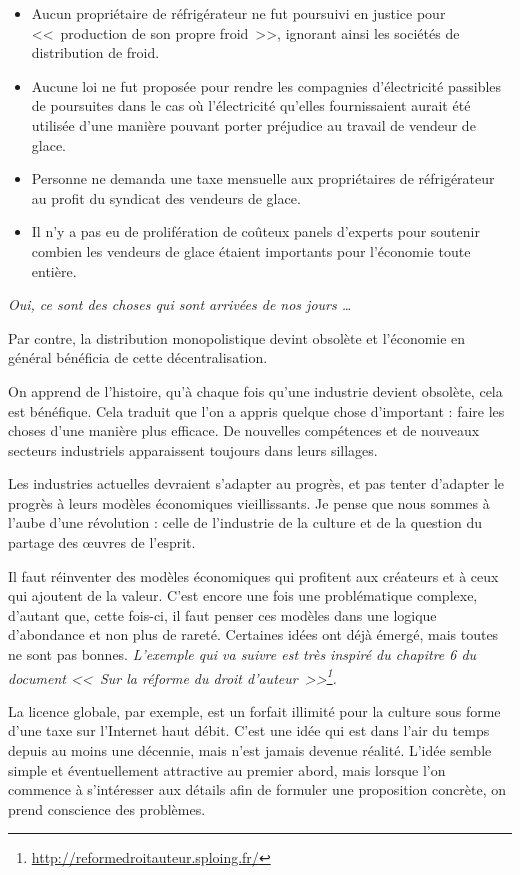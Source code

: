\begin{itemize}
\item Aucun propriétaire de réfrigérateur ne fut poursuivi en justice pour <<~production de son propre froid~>>, ignorant ainsi les sociétés de distribution de froid.
\item Aucune loi ne fut proposée pour rendre les compagnies d'électricité passibles de poursuites dans le cas où l'électricité qu'elles fournissaient aurait été utilisée d'une manière pouvant porter préjudice au travail de vendeur de glace.
\item Personne ne demanda une taxe mensuelle aux propriétaires de réfrigérateur au profit du syndicat des vendeurs de glace.
\item Il n'y a pas eu de prolifération de coûteux panels d'experts pour soutenir combien les vendeurs de glace étaient importants pour l'économie toute entière.
\end{itemize}

\textit{Oui, ce sont des choses qui sont arrivées de nos jours \dots{}}

Par contre, la distribution monopolistique devint obsolète et l'économie en général bénéficia de cette décentralisation.

On apprend de l'histoire, qu'à chaque fois qu'une industrie devient obsolète, cela est bénéfique.
Cela traduit que l'on a appris quelque chose d'important : faire les choses d'une manière plus efficace.
De nouvelles compétences et de nouveaux secteurs industriels apparaissent toujours dans leurs sillages.

Les industries actuelles devraient s'adapter au progrès, et pas tenter d'adapter le progrès à leurs modèles économiques vieillissants.
Je pense que nous sommes à l'aube d'une révolution : celle de l'industrie de la culture et de la question du partage des œuvres de l'esprit.

Il faut réinventer des modèles économiques qui profitent aux créateurs et à ceux qui ajoutent de la valeur.
C'est encore une fois une problématique complexe, d'autant que, cette fois-ci, il faut penser ces modèles dans une logique d'abondance et non plus de rareté.
Certaines idées ont déjà émergé, mais toutes ne sont pas bonnes.
\textit{L'exemple qui va suivre est très inspiré du chapitre 6 du document <<~Sur la réforme du droit d'auteur~>>\footnote{\url{http://reformedroitauteur.sploing.fr/}}.}

La licence globale, par exemple, est un forfait illimité pour la culture sous forme d'une taxe sur l'Internet haut débit.
C'est une idée qui est dans l'air du temps depuis au moins une décennie, mais n'est jamais devenue réalité.
L'idée semble simple et éventuellement attractive au premier abord, mais lorsque l'on commence à s'intéresser aux détails afin de formuler une proposition concrète, on prend conscience des problèmes.


